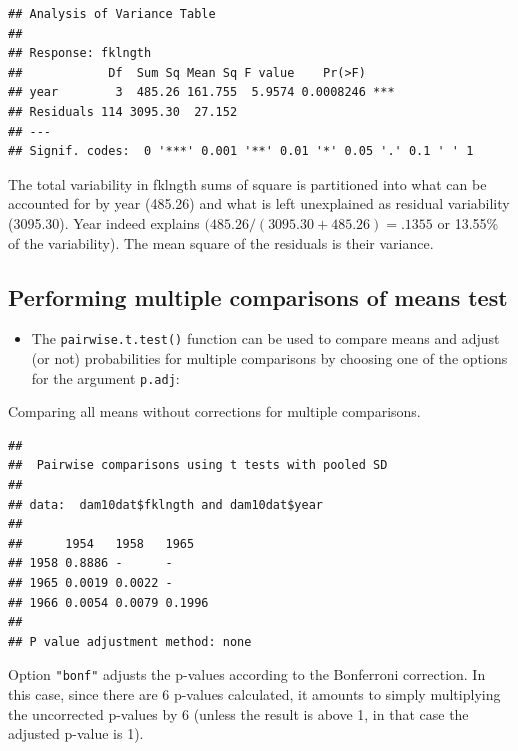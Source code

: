 \documentclass[
  12pt,
]{book}
\newenvironment{Shaded}{\begin{snugshade}}{\end{snugshade}}
\newcommand{\DataTypeTok}[1]{\textcolor[rgb]{0.13,0.29,0.53}{#1}}
\newcommand{\KeywordTok}[1]{\textcolor[rgb]{0.13,0.29,0.53}{\textbf{#1}}}
\newcommand{\NormalTok}[1]{#1}
\newcommand{\OperatorTok}[1]{\textcolor[rgb]{0.81,0.36,0.00}{\textbf{#1}}}
\newcommand{\StringTok}[1]{\textcolor[rgb]{0.31,0.60,0.02}{#1}}
\providecommand{\tightlist}{%
  \setlength{\itemsep}{0pt}\setlength{\parskip}{0pt}}
\begin{document}
\begin{verbatim}
## Analysis of Variance Table
## 
## Response: fklngth
##            Df  Sum Sq Mean Sq F value    Pr(>F)    
## year        3  485.26 161.755  5.9574 0.0008246 ***
## Residuals 114 3095.30  27.152                      
## ---
## Signif. codes:  0 '***' 0.001 '**' 0.01 '*' 0.05 '.' 0.1 ' ' 1
\end{verbatim}

The total variability in fklngth sums of square is partitioned into what can be accounted for by year (485.26) and what is left unexplained as residual variability (3095.30). Year indeed explains \((485.26/(3095.30+485.26)=.1355\) or 13.55\% of the variability). The mean square of the residuals is their variance.

\hypertarget{performing-multiple-comparisons-of-means-test}{%
\subsection{Performing multiple comparisons of means test}\label{performing-multiple-comparisons-of-means-test}}

\begin{itemize}
\tightlist
\item
  The \texttt{pairwise.t.test()} function can be used to compare means and adjust (or not) probabilities for multiple comparisons by choosing one of the options for the argument \texttt{p.adj}:
\end{itemize}

Comparing all means without corrections for multiple comparisons.

\begin{Shaded}
\end{Shaded}

\begin{verbatim}
## 
##  Pairwise comparisons using t tests with pooled SD 
## 
## data:  dam10dat$fklngth and dam10dat$year 
## 
##      1954   1958   1965  
## 1958 0.8886 -      -     
## 1965 0.0019 0.0022 -     
## 1966 0.0054 0.0079 0.1996
## 
## P value adjustment method: none
\end{verbatim}

Option \texttt{"bonf"} adjusts the p-values according to the Bonferroni correction. In this case, since there are 6 p-values calculated, it amounts to simply multiplying the uncorrected p-values by 6 (unless the result is above 1, in that case the adjusted p-value is 1).
\end{document}
